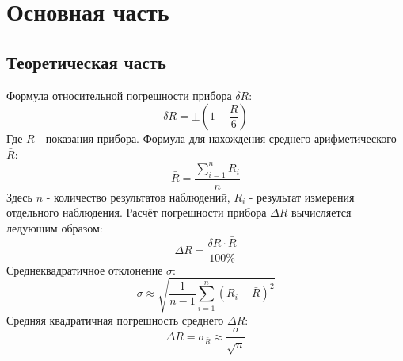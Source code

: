 \section{Основная часть}

\subsection{Теоретическая часть}
Формула относительной погрешности прибора $\delta R$:
\begin{equation}
    \delta R = \pm\left(1+\frac{R}{6}\right)
\end{equation}
Где $R$ - показания прибора. 
Формула для нахождения среднего арифметического $\bar{R}$:
\begin{equation}
    \bar{R}=\frac{\sum_{i=1}^{n} R_i}{n}
\end{equation}
Здесь $n$ - количество результатов наблюдений, $R_i$ - результат измерения отдельного наблюдения.
Расчёт погрешности прибора $\Delta R$ вычисляется ледующим образом:
\begin{equation}
    \Delta R = \frac{\delta R\cdot\bar{R}}{100\%}
\end{equation}
Среднеквадратичное отклонение $\sigma$:
\begin{equation}
    \sigma \approx \sqrt{\frac{1}{n-1}\sum_{i=1}^{n} (R_i-\bar{R})^2}
\end{equation}
Средняя квадратичная погрешность среднего $\Delta R$:
\begin{equation}
    \Delta R={\sigma}_{\bar{R}}\approx\frac{\sigma}{\sqrt{n}}
\end{equation}

